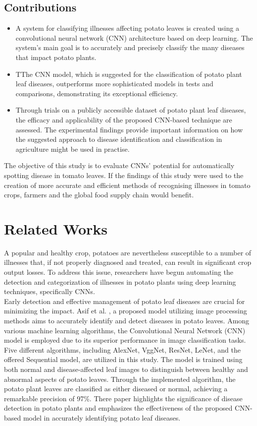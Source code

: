 \documentclass[conference]{IEEEtran}
\begin{document}
\subsection{Contributions}
\begin{itemize}
    \item A system for classifying illnesses affecting potato leaves is created using a convolutional neural network (CNN) architecture based on deep learning. The system's main goal is to accurately and precisely classify the many diseases that impact potato plants.
    \item TThe CNN model, which is suggested for the classification of potato plant leaf diseases, outperforms more sophisticated models in tests and comparisons, demonstrating its exceptional efficiency.
    \item Through trials on a publicly accessible dataset of potato plant leaf diseases, the efficacy and applicability of the proposed CNN-based technique are assessed. The experimental findings provide important information on how the suggested approach to disease identification and classification in agriculture might be used in practise.\\
\end{itemize}
 
The objective of this study is to evaluate CNNs' potential for automatically spotting disease in tomato leaves. If the findings of this study were used to the creation of more accurate and efficient methods of recognising illnesses in tomato crops, farmers and the global food supply chain would benefit.


\section{Related Works}
A popular and healthy crop, potatoes are nevertheless susceptible to a number of illnesses that, if not properly diagnosed and treated, can result in significant crop output losses. To address this issue, researchers have begun automating the detection and categorization of illnesses in potato plants using deep learning techniques, specifically CNNs.\\

Early detection and effective management of potato leaf diseases are crucial for minimizing the impact. Asif et al. \cite{9316021}, a proposed model utilizing image processing methods aims to accurately identify and detect diseases in potato leaves. Among various machine learning algorithms, the Convolutional Neural Network (CNN) model is employed due to its superior performance in image classification tasks. Five different algorithms, including AlexNet, VggNet, ResNet, LeNet, and the offered Sequential model, are utilized in this study. The model is trained using both normal and disease-affected leaf images to distinguish between healthy and abnormal aspects of potato leaves. Through the implemented algorithm, the potato plant leaves are classified as either diseased or normal, achieving a remarkable precision of 97\%. There paper highlights the significance of disease detection in potato plants and emphasizes the effectiveness of the proposed CNN-based model in accurately identifying potato leaf diseases.\\
\end{document}
